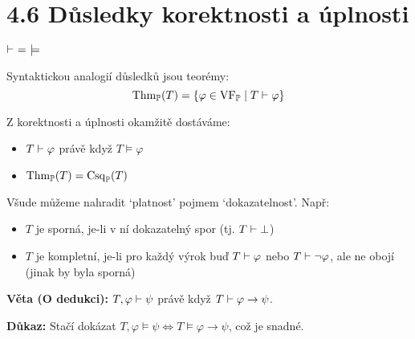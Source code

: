 \documentclass{beamer}
\begin{document}
\section{4.6 Důsledky korektnosti a úplnosti}


\begin{frame}{$\proves\ =\ \models$}

    Syntaktickou analogií \alert{důsledků} jsou \alert{teorémy}:
    $$\operatorname{Thm}_\mathbb P(T)=\{\varphi\in\operatorname{VF}_\mathbb P\mid T\vdash\varphi\}$$
    
    Z korektnosti a úplnosti okamžitě dostáváme:
        \begin{itemize}
            \item $T\vdash\varphi$ právě když $T\models\varphi$
            \item $\operatorname{Thm}_\mathbb P(T)=\operatorname{Csq}_\mathbb P(T)$
        \end{itemize}
    
    Všude můžeme nahradit `\alert{platnost}' pojmem `\alert{dokazatelnost}'.  Např:
    \begin{itemize}
        \item $T$ je \alert{sporná}, je-li v ní dokazatelný spor (tj. \alert{$T\vdash\bot$})
        \item $T$ je \alert{kompletní}, je-li pro každý výrok buď $T\vdash\varphi$ nebo $T\vdash\neg\varphi$, ale ne obojí (jinak by byla sporná)
    \end{itemize}

    \textbf{Věta (O dedukci):} $T,\varphi\vdash\psi$ právě když  $T\vdash\varphi\to\psi$.

    \textbf{Důkaz:} Stačí dokázat $T,\varphi\models\psi\Leftrightarrow T\models\varphi\to\psi$, což je snadné.

\end{frame}
\end{document}
